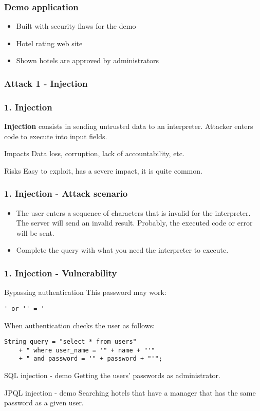 \begin{frame}
\frametitle{Demo application}
\begin{itemize}
\item Built with security flaws for the demo
\item Hotel rating web site
\item Shown hotels are approved by administrators
\end{itemize}
\end{frame}

\subsubsection{Attack 1 - Injection}

\begin{frame}
\frametitle{1. Injection}
\textbf{Injection} consists in sending untrusted data to an interpreter.
Attacker enters code to execute into input fields.
\begin{block}{Impacts}
Data loss, corruption, lack of accountability, etc.
\end{block}
\begin{block}{Risks}
\alert{Easy to exploit}, has a \alert{severe impact}, it is quite common.
\end{block}
\end{frame}

\begin{frame}
\frametitle{1. Injection - Attack scenario}
\begin{itemize}
\item The user enters a sequence of characters that is invalid for the
	interpreter. The server will send an invalid result.
	Probably, the executed code or error will be sent.
\item Complete the query with what you need the interpreter to execute.
\end{itemize}
\end{frame}

\begin{frame}[fragile]
\frametitle{1. Injection - Vulnerability}
\begin{exampleblock}{Bypassing authentication}
This password may work:
\begin{lstlisting}
' or '' = '
\end{lstlisting}
When authentication checks the user as follows:
\begin{lstlisting}
String query = "select * from users"
	+ " where user_name = '" + name + "'"
	+ " and password = '" + password + "'";
\end{lstlisting}
\end{exampleblock}
\pause
\begin{exampleblock}{SQL injection - demo}
Getting the users' passwords as administrator.
\end{exampleblock}
\pause
\begin{exampleblock}{JPQL injection - demo}
Searching hotels that have a manager that has the same password as a given
user.
\end{exampleblock}
\end{frame}

